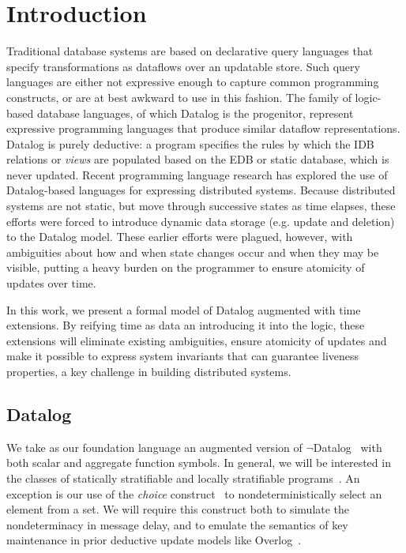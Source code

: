\section{Introduction}

Traditional database systems are based on declarative query languages that specify transformations as dataflows over an updatable store.
Such query languages are either not expressive enough to capture common programming constructs, or are at best awkward to
use in this fashion.  The family of logic-based database languages, of which Datalog is the progenitor, represent
expressive programming languages that produce similar dataflow representations.  Datalog is purely deductive: a program specifies the rules
by which the IDB relations or \emph{views} are populated based on the EDB or static database, which is never updated.
Recent programming language research has explored the use of Datalog-based languages for expressing distributed systems.  Because distributed
systems are not static, but move through successive states as time elapses, these efforts were forced to introduce dynamic data storage (e.g. update and
deletion) to the Datalog model.  These earlier efforts were plagued, however, with ambiguities about how and when state changes occur and when 
they may be visible, putting a heavy burden on the programmer to ensure atomicity of updates over time.

In this work, we present a formal model of Datalog augmented with time extensions.  By reifying time as data an introducing it into the logic, these 
extensions will eliminate existing ambiguities, ensure atomicity of updates and make it possible to express system invariants that 
can guarantee liveness properties, a key challenge in building distributed systems.


\subsection{Datalog}

We take as our foundation language an augmented version of $\lnot$Datalog~\cite{ullmanbook} with both scalar and aggregate function symbols.  
In general, we will be interested in the classes of statically stratifiable and locally stratifiable programs~\cite{prz}.
An exception is our use of the \emph{choice} construct~\cite{greedychoice, eventchoice} to nondeterministically select an element from a set.
We will require this construct both to simulate the nondeterminacy in message delay, and to emulate the semantics of key maintenance in 
prior deductive update models like Overlog~\cite{boon}.
